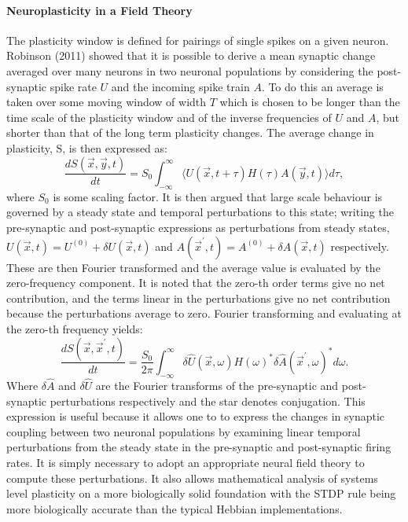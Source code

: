 \paragraph{Neuroplasticity in a Field Theory}
The plasticity window is defined for pairings of single spikes on a given neuron. Robinson (2011) \cite{Robinson2011-ve} showed that it is possible to derive a mean synaptic change averaged over many neurons in two neuronal populations by considering the post-synaptic spike rate $U$ and the incoming spike train $A$. To do this an average is taken over some moving window of width $T$ which is chosen to be longer than the time scale of the plasticity window and of the inverse frequencies of $U$ and $A$, but shorter than that of the long term plasticity changes. The average change in plasticity, S, is then expressed as:
\begin{equation}
\frac{dS(\vec{x},\vec{y},t)}{dt} = S_0 \int_{-\infty}^{\infty} \langle U(\vec{x},t+\tau) H(\tau) A(\vec{y},t) \rangle d\tau,
\end{equation}
where $S_0$ is some scaling factor. It is then argued that large scale behaviour is governed by a steady state and temporal perturbations to this state; writing the pre-synaptic and post-synaptic expressions as perturbations from steady states, $U(\vec{x},t) =U^{(0)} + \delta U(\vec{x},t)$ and $A(\vec{x}^\prime,t) =A^{(0)} + \delta  A(\vec{x},t)$ respectively. These are then Fourier transformed and the average value is evaluated by the zero-frequency component. It is noted that the zero-th order terms give no net contribution, and the terms linear in the perturbations give no net contribution because the perturbations average to zero. Fourier transforming and evaluating at the zero-th frequency yields:
\begin{equation} \label{robinsonSTDP}
\frac{dS(\vec{x},\vec{x}^\prime,t)}{dt} = \frac{S_0}{2\pi} \int_{-\infty}^{\infty} \delta \hat{U}(\vec{x},\omega) H(\omega)^* \delta\hat{A}(\vec{x}^\prime,\omega)^*d\omega.
\end{equation}
Where $\delta\hat{A}$ and $\delta \hat{U}$ are the Fourier transforms of the pre-synaptic and post-synaptic perturbations respectively and the star denotes conjugation. This expression is useful because it allows one to to express the changes in synaptic coupling between two neuronal populations by examining linear temporal perturbations from the steady state in the pre-synaptic and post-synaptic firing rates. It is simply necessary to adopt an appropriate neural field theory to compute these perturbations. It also allows mathematical analysis of systems level plasticity on a more biologically solid foundation with the STDP rule being more biologically accurate than the typical Hebbian implementations.
